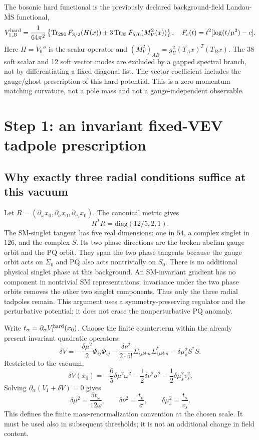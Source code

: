\documentclass[11pt]{article}
\newcommand{\tr}{\operatorname{Tr}}
\newcommand{\MS}{\overline{\mathrm{MS}}}
\begin{document}
The bosonic hard functional is the previously declared background-field
Landau-$\MS$ functional,
\begin{equation}
 V_{1,B}^{\rm hard}=\frac1{64\pi^2}
 \left\{\tr_{290}F_{3/2}(H(x))+3\tr_{33}F_{5/6}(M_V^2(x))\right\},
 \quad F_c(t)=t^2[\log(t/\mu^2)-c].
\label{eq:CW}
\end{equation}
Here $H=V_0''$ is the scalar operator and
$(M_V^2)_{AB}=g_U^2(T_Ax)^T(T_Bx)$. The 38 soft scalar and 12 soft vector
modes are excluded by a gapped spectral branch, not by differentiating a
fixed diagonal list. The vector coefficient includes the gauge/ghost
prescription of this hard potential. This is a zero-momentum matching
curvature, not a pole mass and not a gauge-independent observable.

\section{Step 1: an invariant fixed-VEV tadpole prescription}
\subsection{Why exactly three radial conditions suffice at this vacuum}
Let $R=(\partial_\omega x_0,\partial_\sigma x_0,\partial_{v_s}x_0)$.
The canonical metric gives
\begin{equation}
 R^TR=\mathrm{diag}(12/5,2,1).
\end{equation}
The SM-singlet tangent has five real dimensions: one in $54$, a complex
singlet in $126$, and the complex $S$. Its two phase directions are the
broken abelian gauge orbit and the PQ orbit. They span the two phase
tangents because the gauge orbit acts on $\Sigma_0$ and PQ also acts
nontrivially on $S_0$. There is no additional physical singlet phase at
this background. An SM-invariant gradient has no component in nontrivial
SM representations; invariance under the two phase orbits removes the
other two singlet components. Thus only the three radial tadpoles remain.
This argument uses a symmetry-preserving regulator and the perturbative
potential; it does not erase the nonperturbative PQ anomaly.

Write $t_\alpha=\partial_\alpha V_1^{\rm hard}(x_0)$. Choose the finite
counterterm within the already present invariant quadratic operators:
\begin{equation}
 \delta V=-\frac{\delta\mu^2}{2}\Phi_{ij}\Phi_{ij}
 -\frac{\delta\nu^2}{2\cdot5!}\Sigma_{ijklm}\Sigma^*_{ijklm}
 -\delta\mu_s^2 S^*S.
\end{equation}
Restricted to the vacuum,
\begin{equation}
 \delta V(x_0)=-\frac65\delta\mu^2\omega^2
 -\frac12\delta\nu^2\sigma^2-\frac12\delta\mu_s^2 v_s^2.
\end{equation}
Solving $\partial_\alpha(V_1+\delta V)=0$ gives
\begin{equation}
 \boxed{\delta\mu^2=\frac{5t_\omega}{12\omega},\qquad
 \delta\nu^2=\frac{t_\sigma}{\sigma},\qquad
 \delta\mu_s^2=\frac{t_s}{v_s}.}
\label{eq:tadpole}
\end{equation}
This defines the finite mass-renormalization convention at the chosen
scale. It must be used also in subsequent thresholds; it is not an
additional change in field content.
\end{document}
